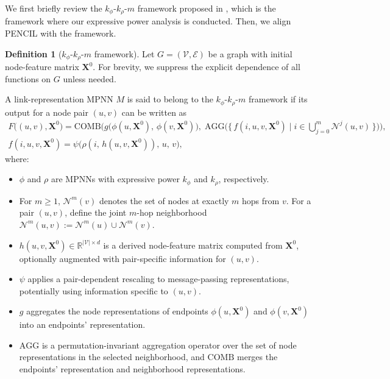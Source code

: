 \documentclass{article}
\theoremstyle{plain}
\theoremstyle{definition}
\newtheorem{definition}[theorem]{Definition}
\theoremstyle{remark}
\begin{document}
We first briefly review the \(k_\phi\text{-}k_\rho\text{-}m\) framework proposed in \cite{lachi2025bridgingtheorypracticelink}, which is the framework where our expressive power analysis is conducted. Then, we align PENCIL with the framework.

\begin{definition}[$k_\phi$-$k_\rho$-$m$ framework]
    Let $G=(\mathcal{V},\mathcal{E})$ be a graph with initial node-feature matrix $\mathbf{X}^0$. For brevity, we suppress the explicit dependence of all functions on $G$ unless needed.

    A link-representation MPNN $M$ is said to belong to the $k_\phi$-$k_\rho$-$m$ framework if its output for a node pair $(u,v)$ can be written as
    \begin{gather}
    F\big((u,v),\mathbf{X}^0\big)
    = \mathrm{COMB}\Big(
        g\big(\phi(u,\mathbf{X}^0),\,\phi(v,\mathbf{X}^0)\big),\;
        \mathrm{AGG}\big(\{\, f(i,u,v,\mathbf{X}^0)\mid i \in \bigcup_{j=0}^{m} \mathcal{N}^{j}(u,v)\,\}\big)
    \Big), \\
    f(i,u,v,\mathbf{X}^0)
    = \psi\big(\rho(i,\,h(u,v,\mathbf{X}^0)),\,u,\,v\big),
    \end{gather}
    where:

    \begin{itemize}
        \item $\phi$ and $\rho$ are MPNNs with expressive power $k_\phi$ and $k_\rho$, respectively.
        \item For $m\ge 1$, $\mathcal{N}^m(v)$ denotes the set of nodes at exactly $m$ hops from $v$. For a pair $(u,v)$, define the joint $m$-hop neighborhood $\mathcal{N}^m(u,v) := \mathcal{N}^m(u)\cup \mathcal{N}^m(v)$.
        \item $h(u,v,\mathbf{X}^0)\in\mathbb{R}^{|\mathcal{V}|\times d}$ is a derived node-feature matrix computed from $\mathbf{X}^0$, optionally augmented with pair-specific information for $(u,v)$.
        \item $\psi$ applies a pair-dependent rescaling to message-passing representations, potentially using information specific to $(u,v)$.
        \item $g$ aggregates the node representations of endpoints $\phi(u,\mathbf{X}^0)$ and $\phi(v,\mathbf{X}^0)$ into an endpoints' representation.
        \item $\mathrm{AGG}$ is a permutation-invariant aggregation operator over the set of node representations in the selected neighborhood, and $\mathrm{COMB}$ merges the endpoints' representation and neighborhood representations.
    \end{itemize}
    
\end{definition}
\end{document}
